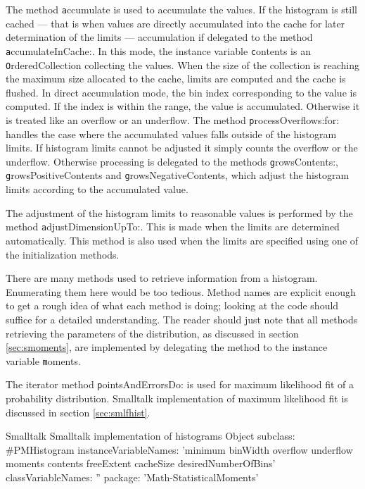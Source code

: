 The method {\texttt accumulate} is used to accumulate the values. If
the histogram is still cached --- that is when values are directly
accumulated into the cache for later determination of the limits
--- accumulation if delegated to the method {\texttt
accumulateInCache:}. In this mode, the instance variable {\texttt
contents} is an {\texttt OrderedCollection} collecting the values.
When the size of the collection is reaching the maximum size
allocated to the cache, limits are computed and the cache is
flushed. In direct accumulation mode, the bin index corresponding
to the value is computed. If the index is within the range, the
value is accumulated. Otherwise it is treated like an overflow or
an underflow. The method {\texttt processOverflows:for:} handles the
case where the accumulated values falls outside of the histogram
limits. If histogram limits cannot be adjusted it simply counts
the overflow or the underflow. Otherwise processing is delegated
to the methods {\texttt growsContents:}, {\texttt growsPositiveContents}
and {\texttt growsNegativeContents}, which adjust the histogram limits
according to the accumulated value.

The adjustment of the histogram limits to reasonable values is
performed by the method {\texttt adjustDimensionUpTo:}. This is made
when the limits are determined automatically. This method is also
used when the limits are specified using one of the initialization
methods.

There are many methods used to retrieve information from a
histogram. Enumerating them here would be too tedious. Method
names are explicit enough to get a rough idea of what each method
is doing; looking at the code should suffice for a detailed
understanding. The reader should just note that all methods
retrieving the parameters of the distribution, as discussed in
section \ref{sec:smoments}, are implemented by delegating the
method to the instance variable {\texttt moments}.

The iterator method {\texttt pointsAndErrorsDo:} is used for maximum
likelihood fit of a probability distribution. Smalltalk
implementation of maximum likelihood fit is discussed in section
\ref{sec:smlfhist}.

\begin{listing}[label=lst:histogram]{Smalltalk}
  {Smalltalk implementation of histograms}
Object subclass: #PMHistogram
   instanceVariableNames: 'minimum binWidth overflow underflow moments contents freeExtent cacheSize desiredNumberOfBins'
   classVariableNames: ''
   package: 'Math-StatisticalMoments'
\end{listing}

